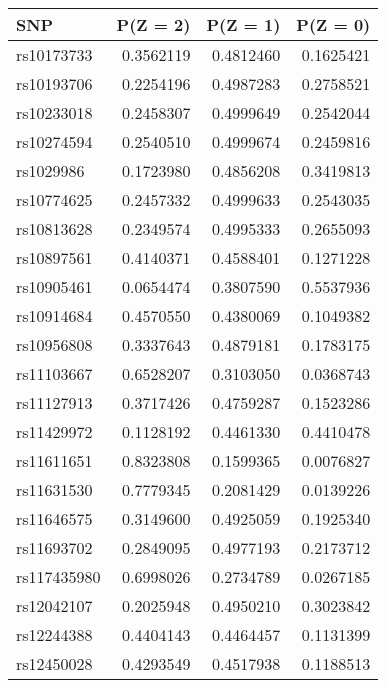 \documentclass[
]{article}
\theoremstyle{plain}
\begin{document}
\begin{table}[H]
  \caption{Table of the marginal distribution of instruments, $P(Z = z), z=0,1,2$, estimated after preprocessing for analysis in Section \ref{smoking-effect-on-lung-cancer}}
  \label{tab:marginal-distribution-of-instruments-lung-cancer}
  \begin{minipage}{0.5\linewidth}
    \center
    \begin{table}[H]
\centering
\begin{tabular}{lrrr}
\toprule
SNP & P(Z = 2) & P(Z = 1) & P(Z = 0)\\
\midrule
rs10173733 & 0.3562119 & 0.4812460 & 0.1625421\\
rs10193706 & 0.2254196 & 0.4987283 & 0.2758521\\
rs10233018 & 0.2458307 & 0.4999649 & 0.2542044\\
rs10274594 & 0.2540510 & 0.4999674 & 0.2459816\\
rs1029986 & 0.1723980 & 0.4856208 & 0.3419813\\
\addlinespace
rs10774625 & 0.2457332 & 0.4999633 & 0.2543035\\
rs10813628 & 0.2349574 & 0.4995333 & 0.2655093\\
rs10897561 & 0.4140371 & 0.4588401 & 0.1271228\\
rs10905461 & 0.0654474 & 0.3807590 & 0.5537936\\
rs10914684 & 0.4570550 & 0.4380069 & 0.1049382\\
\addlinespace
rs10956808 & 0.3337643 & 0.4879181 & 0.1783175\\
rs11103667 & 0.6528207 & 0.3103050 & 0.0368743\\
rs11127913 & 0.3717426 & 0.4759287 & 0.1523286\\
rs11429972 & 0.1128192 & 0.4461330 & 0.4410478\\
rs11611651 & 0.8323808 & 0.1599365 & 0.0076827\\
\addlinespace
rs11631530 & 0.7779345 & 0.2081429 & 0.0139226\\
rs11646575 & 0.3149600 & 0.4925059 & 0.1925340\\
rs11693702 & 0.2849095 & 0.4977193 & 0.2173712\\
rs117435980 & 0.6998026 & 0.2734789 & 0.0267185\\
rs12042107 & 0.2025948 & 0.4950210 & 0.3023842\\
\addlinespace
rs12244388 & 0.4404143 & 0.4464457 & 0.1131399\\
rs12450028 & 0.4293549 & 0.4517938 & 0.1188513\\

\end{tabular}
\end{table}
\end{minipage}
\end{table}
\end{document}
